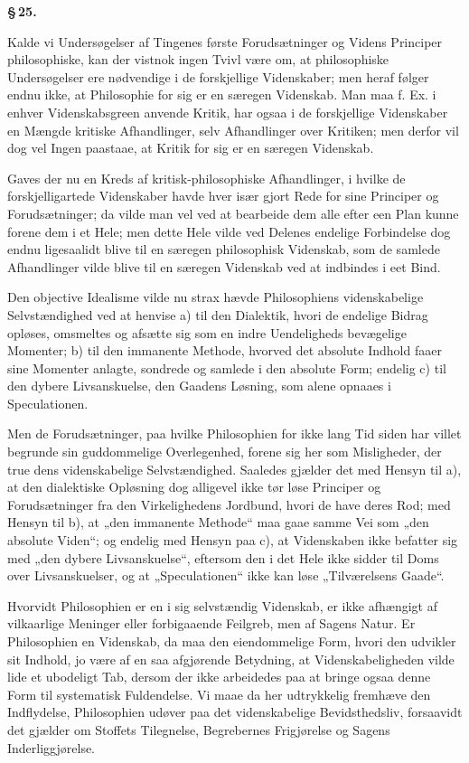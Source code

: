 \documentclass[12pt]{book}
\newcommand{\opage}[1]{\marginnote{\footnotesize\textit{[#1]}}}
\begin{document}
\begin{center}{\bfseries \S\,25.}\end{center}

Kalde vi Undersøgelser af Tingenes første Forudsætninger og Videns Principer philosophiske,
kan der vistnok ingen Tvivl være om, at philosophiske Undersøgelser ere nødvendige i de
forskjellige Videnskaber; men heraf følger endnu ikke, at Philosophie for sig er en særegen
Videnskab. Man maa f. Ex. i enhver Videnskabsgreen anvende Kritik, har ogsaa i de
forskjellige Videnskaber en Mængde kritiske Afhandlinger, selv Afhandlinger over Kritiken;
men derfor vil dog vel Ingen paastaae, at Kritik for sig er en særegen Videnskab.

Gaves der nu en Kreds af kritisk-philosophiske Afhandlinger, i hvilke de forskjelligartede
Videnskaber havde hver især gjort Rede for sine Principer og Forudsætninger; da vilde man
vel ved at bearbeide dem alle efter een Plan kunne forene dem i et Hele; men dette Hele
vilde ved Delenes endelige Forbindelse dog endnu ligesaalidt blive til en særegen
philosophisk Videnskab, som de samlede Afhandlinger vilde blive til en særegen Videnskab ved
at indbindes i eet Bind.

Den objective Idealisme vilde nu strax hævde Philosophiens videnskabelige Selvstændighed ved
at henvise a) til den Dialektik, hvori de endelige Bidrag opløses, omsmeltes og afsætte sig
som en indre Uendeligheds bevægelige Momenter; b) til den immanente Methode, hvorved det
absolute Indhold faaer sine Momenter anlagte, sondrede og samlede i den absolute Form;
endelig c) til den dybere Livsanskuelse, den Gaadens Løsning, som alene opnaaes i
Speculationen.

Men de Forudsætninger, paa hvilke Philosophien for ikke lang Tid siden har villet begrunde
sin guddommelige Overlegenhed, forene sig her som Misligheder, der true dens videnskabelige
Selvstændighed. Saaledes gjælder det med
\opage{112} Hensyn til a), at den dialektiske Opløsning dog alligevel ikke tør løse Principer og
Forudsætninger fra den Virkelighedens Jordbund, hvori de have deres Rod; med Hensyn til b),
at „den immanente Methode“ maa gaae samme Vei som „den absolute Viden“; og endelig med
Hensyn paa c), at Videnskaben ikke befatter sig med „den dybere Livsanskuelse“, eftersom den
i det Hele ikke sidder til Doms over Livsanskuelser, og at „Speculationen“ ikke kan løse
„Tilværelsens Gaade“.

Hvorvidt Philosophien er en i sig selvstændig Videnskab, er ikke afhængigt af vilkaarlige
Meninger eller forbigaaende Feilgreb, men af Sagens Natur. Er Philosophien en Videnskab, da
maa den eiendommelige Form, hvori den udvikler sit Indhold, jo være af en saa afgjørende
Betydning, at Videnskabeligheden vilde lide et ubodeligt Tab, dersom der ikke arbeidedes paa
at bringe ogsaa denne Form til systematisk Fuldendelse. Vi maae da her udtrykkelig fremhæve
den Indflydelse, Philosophien udøver paa det videnskabelige Bevidsthedsliv, forsaavidt det
gjælder om Stoffets Tilegnelse, Begrebernes Frigjørelse og Sagens Inderliggjørelse.
\end{document}
